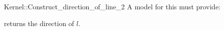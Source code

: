 \begin{ccRefFunctionObjectConcept}{Kernel::Construct_direction_of_line_2}
A model for this must provide:


       {returns the direction of $l$.}


\end{ccRefFunctionObjectConcept}
